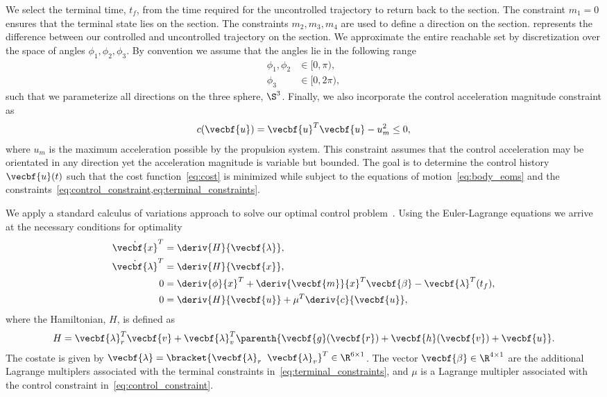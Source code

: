 We select the terminal time, \( t_f \), from the time required for the uncontrolled trajectory to return back to the \Poincare section.
The constraint \( m_1 = 0 \) ensures that the terminal state lies on the \Poincare section.
The constraints \( m_2, m_3, m_4 \) are used to define a direction on the \Poincare section.
 represents the difference between our controlled and uncontrolled trajectory on the \Poincare section.
We approximate the entire reachable set by discretization  over the space of angles \(\phi_1, \phi_2, \phi_3 \).
By convention we assume that the angles lie in the following range
\begin{align*}
    \phi_1, \phi_2 &\in [ 0, \pi ) ,\\
    \phi_3 &\in [ 0 , 2 \pi ) ,
\end{align*}
such that we parameterize all directions on the three sphere, \(\S^3\).
Finally, we also incorporate the control acceleration magnitude constraint as
\begin{align}\label{eq:control_constraint}
    c(\vecbf{u}) = \vecbf{u}^T \vecbf{u} - u_m^2 \leq 0 ,
\end{align}
where \( u_m \) is the maximum acceleration possible by the propulsion system.
This constraint assumes that the control acceleration may be orientated in any direction yet the acceleration magnitude is variable but bounded.
The goal is to determine the control history \( \vecbf{u}(t) \) such that the cost function~\cref{eq:cost} is minimized while subject to the equations of motion~\cref{eq:body_eoms} and the constraints~\cref{eq:control_constraint,eq:terminal_constraints}.

We apply a standard calculus of variations approach to solve our optimal control problem~\cite{bryson1975}.
Using the Euler-Lagrange equations we arrive at the necessary conditions for optimality
\begin{align}\label{eq:necc_conditions}
    \begin{split}
        \dot{\vecbf{x}} ^T &= \deriv{H}{\vecbf{\lambda}} ,\\
        \dot{\vecbf{\lambda}}^T &= \deriv{H}{\vecbf{x}} , \\
        0 &= \deriv{\phi}{x}^T + \deriv{\vecbf{m}}{x}^T \vecbf{\beta} - \vecbf{\lambda}^T(t_f) , \\
        0 &= \deriv{H}{\vecbf{u}} + \mu^T \deriv{c}{\vecbf{u}} ,
    \end{split}
\end{align}
where the Hamiltonian, \( H\), is defined as
\begin{align}\label{eq:hamiltonian}
    H = \vecbf{\lambda}_r^T \vecbf{v} + \vecbf{\lambda}_v^T \parenth{\vecbf{g}(\vecbf{r}) + \vecbf{h}(\vecbf{v}) + \vecbf{u}}.
\end{align}
The costate is given by \( \vecbf{\lambda} = \bracket{ \vecbf{\lambda}_r~\> \vecbf{\lambda}_v }^T \in \R^{6 \times 1}\). 
The vector \( \vecbf{\beta} \in \R^{4 \times 1} \) are the additional Lagrange multiplers associated with the terminal constraints in~\cref{eq:terminal_constraints}, and \( \mu \) is a Lagrange multipler associated with the control constraint in~\cref{eq:control_constraint}.

